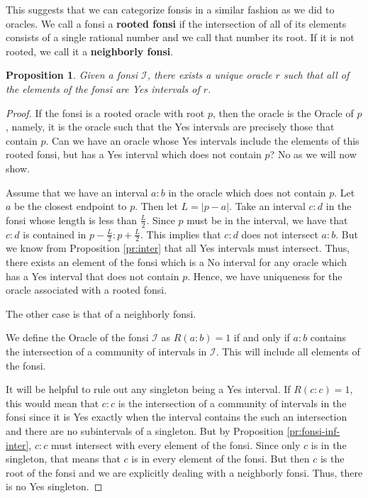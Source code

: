 \documentclass[12pt]{article}
\newtheorem{proposition}{Proposition}[subsection]
\begin{document}
This suggests that we can categorize fonsis in a similar fashion as we did to oracles. We call a fonsi a \textbf{rooted fonsi} if the intersection of all of its elements consists of a single rational number and we call that number its root. If it is not rooted, we call it a \textbf{neighborly fonsi}. 

\begin{proposition}\label{pr:fon-oracle-exists}
Given a fonsi $\mathcal{I}$, there exists a unique oracle $r$ such that all of the elements of the fonsi are Yes intervals of $r$.
\end{proposition}

\begin{proof}
If the fonsi is a rooted oracle with root $p$, then the oracle is the Oracle of $p$, namely, it is the oracle such that the Yes intervals are precisely those that contain $p$. Can we have an oracle whose Yes intervals include the elements of this rooted fonsi, but has a Yes interval which does not contain $p$? No as we will now show. 

Assume that we have an interval $a:b$ in the oracle which does not contain $p$. Let $a$ be the closest endpoint to $p$. Then let $L = |p-a|$. Take an interval $c:d$ in the fonsi whose length is less than $\frac{L}{2}$. Since $p$ must be in the interval, we have that $c:d$ is contained in $p-\frac{L}{2}: p + \frac{L}{2}$. This implies that $c:d$ does not intersect $a:b$. But we know from Proposition \ref{pr:inter} that all Yes intervals must intersect. Thus, there exists an element of the fonsi which is a No interval for any oracle which has a Yes interval that does not contain $p$. Hence, we have uniqueness for the oracle associated with a rooted fonsi. 

The other case is that of a neighborly fonsi. 

We define the Oracle of the fonsi $\mathcal{I}$ as $R(a :b) = 1$ if and only if $a : b$ contains the intersection of a community of intervals in $\mathcal{I}$. This will include all elements of the fonsi. 

It will be helpful to rule out any singleton being a Yes interval. If $R(c:c)=1$, this would mean that $c:c$ is the intersection of a community of intervals in the fonsi since it is Yes exactly when the interval contains the such an intersection and there are no subintervals of a singleton. But by Proposition \ref{pr:fonsi-inf-inter}, $c:c$ must intersect with every element of the fonsi. Since only $c$ is in the singleton, that means that $c$ is in every element of the fonsi. But then $c$ is the root of the fonsi and we are explicitly dealing with a neighborly fonsi. Thus, there is no Yes singleton. 



\end{proof}
\end{document}
